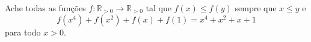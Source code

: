 Ache todas as funções $f: \mathbb{R}_{>0} \to \mathbb{R}_{>0}$ tal que $f(x) \le f(y)$ sempre que $x \le y$ e $$f(x^4) + f(x^2) + f(x) + f(1) = x^4 + x^2 + x + 1$$ para todo $x > 0$.